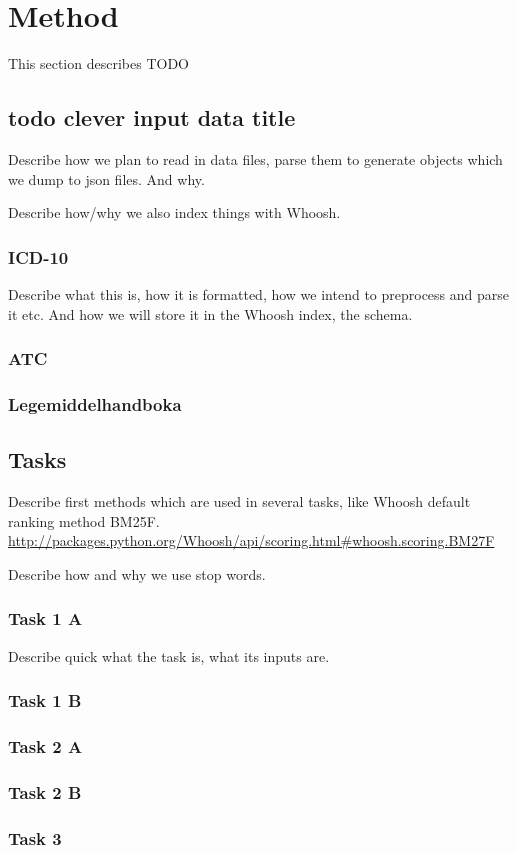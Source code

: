 \chapter{Method}
This section describes TODO


\section{todo clever input data title}
Describe how we plan to read in data files, parse them to generate objects
which we dump to json files. And why.

Describe how/why we also index things with Whoosh.

\subsection{ICD-10}
Describe what this is, how it is formatted, how we intend to preprocess and
parse it etc. And how we will store it in the Whoosh index, the schema.

\subsection{ATC}

\subsection{Legemiddelhandboka} %


\section{Tasks}
Describe first methods which are used in several tasks, like Whoosh default
ranking method BM25F.
\url{http://packages.python.org/Whoosh/api/scoring.html#whoosh.scoring.BM27F}

Describe how and why we use stop words.

\subsection{Task 1 A}
Describe quick what the task is, what its inputs are.

\subsection{Task 1 B}

\subsection{Task 2 A}

\subsection{Task 2 B}

\subsection{Task 3}


